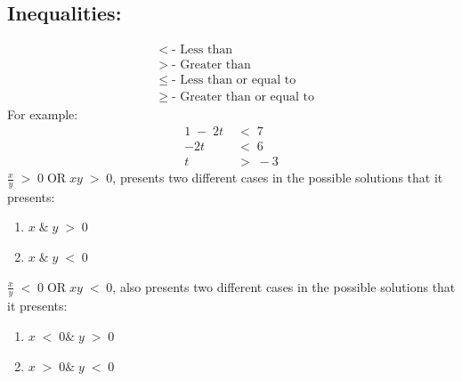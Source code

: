 \documentclass[a5paper]{article}
\begin{document}
	\subsection{Inequalities:}
	\begin{align*}
		&<\;\text{- Less than}\\
		&>\;\text{- Greater than}\\
		&\leq\;\text{- Less than or equal to}\\
		&\geq\;\text{- Greater than or equal to}
	\end{align*}
	For example:
	\begin{align*}
		1\;-\;2t\;&<\;7\\
		-2t\;&<\;6\\
		t\;&>\;-3
	\end{align*}
	\smallskip
	$\frac{x}{y}\;>\;0\;\text{OR}\;xy\;>\;0$, presents two different cases in the possible solutions that it presents:
	\begin{enumerate}[start=1,label={Case \roman* - },wide = 25pt, leftmargin = 3em]
		\item $x\;\&\;y\;>\;0$
		\item $x\;\&\;y\;<\;0$
	\end{enumerate}
	\smallskip
	$\frac{x}{y}\;<\;0\;\text{OR}\;xy\;<\;0$, also presents two different cases in the possible solutions that it presents:
	\begin{enumerate}[start=1,label={Case \roman* - },wide = 25pt, leftmargin = 3em]
		\item $x\;<\;0\&\;y\;>\;0$
		\item $x\;>\;0\&\;y\;<\;0$
	\end{enumerate}
\end{document}
